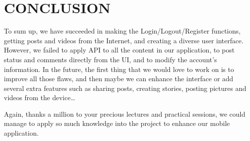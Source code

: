 \newpage
\vspace{6cm}
\section{CONCLUSION}
\hspace{0.7cm}To sum up, we have succeeded in making the Login/Logout/Register functions, getting posts and videos from the Internet, and creating a diverse user interface. However, we failed to apply API to all the content in our application, to post status and comments directly from the UI, and to modify the account’s information. In the future, the first thing that we would love to work on is to improve all those flaws, and then maybe we can enhance the interface or add several extra features such as sharing posts, creating stories, posting pictures and videos from the device… 

\vspace{0.7cm}Again, thanks a million to your precious lectures and practical sessions, we could manage to apply so much knowledge into the project to enhance our mobile application.